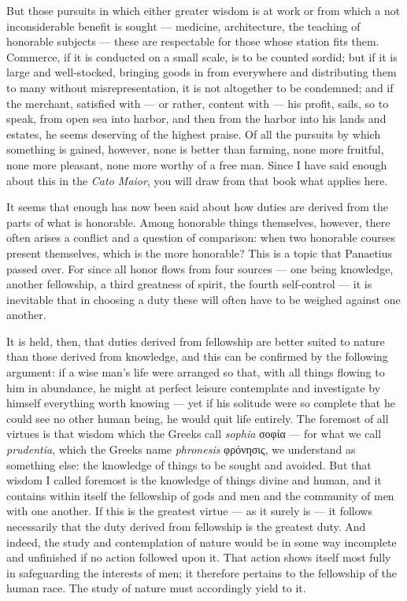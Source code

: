  But those pursuits in which either greater wisdom is at work or from which a not inconsiderable benefit is sought — medicine, architecture, the teaching of honorable subjects — these are respectable for those whose station fits them. Commerce, if it is conducted on a small scale, is to be counted sordid; but if it is large and well-stocked, bringing goods in from everywhere and distributing them to many without misrepresentation, it is not altogether to be condemned; and if the merchant, satisfied with — or rather, content with — his profit, sails, so to speak, from open sea into harbor, and then from the harbor into his lands and estates, he seems deserving of the highest praise. Of all the pursuits by which something is gained, however, none is better than farming, none more fruitful, none more pleasant, none more worthy of a free man. Since I have said enough about this in the \textit{Cato Maior}, you will draw from that book what applies here.

 It seems that enough has now been said about how duties are derived from the parts of what is honorable. Among honorable things themselves, however, there often arises a conflict and a question of comparison: when two honorable courses present themselves, which is the more honorable? This is a topic that Panaetius passed over. For since all honor flows from four sources — one being knowledge, another fellowship, a third greatness of spirit, the fourth self-control — it is inevitable that in choosing a duty these will often have to be weighed against one another.

 It is held, then, that duties derived from fellowship are better suited to nature than those derived from knowledge, and this can be confirmed by the following argument: if a wise man's life were arranged so that, with all things flowing to him in abundance, he might at perfect leisure contemplate and investigate by himself everything worth knowing — yet if his solitude were so complete that he could see no other human being, he would quit life entirely. The foremost of all virtues is that wisdom which the Greeks call \textit{sophia} \textgreek{σοφία} — for what we call \textit{prudentia}, which the Greeks name \textit{phronesis} \textgreek{φρόνησις}, we understand as something else: the knowledge of things to be sought and avoided. But that wisdom I called foremost is the knowledge of things divine and human, and it contains within itself the fellowship of gods and men and the community of men with one another. If this is the greatest virtue — as it surely is — it follows necessarily that the duty derived from fellowship is the greatest duty. And indeed, the study and contemplation of nature would be in some way incomplete and unfinished if no action followed upon it. That action shows itself most fully in safeguarding the interests of men; it therefore pertains to the fellowship of the human race. The study of nature must accordingly yield to it.


